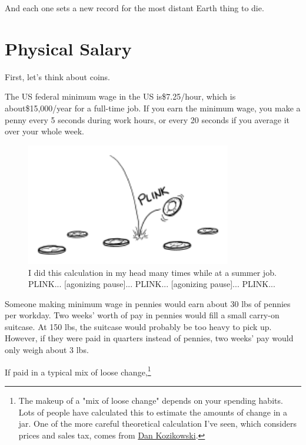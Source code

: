 {{And each one sets a new record for the most distant Earth thing to die.}

{
\chapter{Physical Salary}
}

\hfill{}

{First, let's think about coins.}

{The US federal minimum wage in the US is\$7.25/hour, which is about\$15,000/year for a full-time job. If you earn the minimum wage, you make a penny every 5 seconds during work hours, or every 20 seconds if you average it over your whole week.}

\begin{figure}[!htbp]
\centering
\includegraphics[scale=0.5, max width=0.8\textwidth]{imgs/a/118/plink.png}
\caption{I did this calculation in my head many times while at a summer job. PLINK... [agonizing pause]... PLINK... [agonizing pause]... PLINK...}
\end{figure}

{Someone making minimum wage in pennies would earn about 30 lbs of pennies per workday. Two weeks' worth of pay in pennies would fill a small carry-on suitcase. At 150 lbs, the suitcase would probably be too heavy to pick up. However, if they were paid in quarters instead of pennies, two weeks' pay would only weigh about 3 lbs.}

{If paid in a typical mix of loose change,{\footnote{The makeup of a "mix of loose change" depends on your spending habits. Lots of people have calculated this to estimate the amounts of change in a jar. One of the more careful theoretical calculation I've seen, which considers prices and sales tax, comes from \href{http://dfkoz.tumblr.com/post/20389927354/whats-a-pound-of-change-worth}{Dan Kozikowski}.

}}}}
